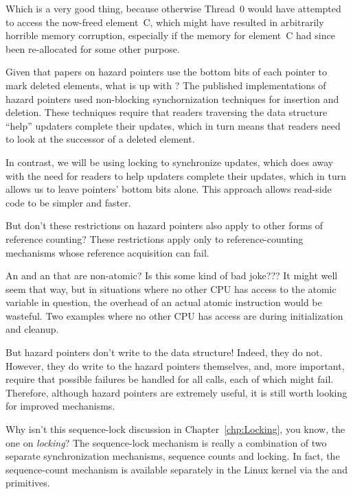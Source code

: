 	Which is a very good thing, because otherwise Thread~0 would
	have attempted to access the now-freed element~C,
	which might have resulted in arbitrarily horrible
	memory corruption, especially if the memory for
	element~C had since been re-allocated for some other
	purpose.

\QuickQ{}
	Given that papers on hazard pointers use the bottom bits
	of each pointer to mark deleted elements, what is up with
	?
\QuickA{}
	The published implementations of hazard pointers used
	non-blocking synchornization techniques for insertion
	and deletion.
	These techniques require that readers traversing the
	data structure ``help'' updaters complete their updates,
	which in turn means that readers need to look at the successor
	of a deleted element.

	In contrast, we will be using locking to synchronize updates,
	which does away with the need for readers to help updaters
	complete their updates, which in turn allows us to leave
	pointers' bottom bits alone.
	This approach allows read-side code to be simpler and faster.

\QuickQ{}
	But don't these restrictions on hazard pointers also apply
	to other forms of reference counting?
\QuickA{}
	These restrictions apply only to reference-counting mechanisms whose
	reference acquisition can fail.

\QuickQ{}
	An  and an  that are
	non-atomic?
	Is this some kind of bad joke???
\QuickA{}
	It might well seem that way, but in situations where no other
	CPU has access to the atomic variable in question, the overhead
	of an actual atomic instruction would be wasteful.
	Two examples where no other CPU has access are
	during initialization and cleanup.

\QuickQ{}
	But hazard pointers don't write to the data structure!
\QuickA{}
	Indeed, they do not.
	However, they do write to the hazard pointers themselves,
	and, more important, require that possible failures be
	handled for all  calls, each of which
	might fail.
	Therefore, although hazard pointers are extremely useful,
	it is still worth looking for improved mechanisms.

\QuickQ{}
	Why isn't this sequence-lock discussion in Chapter~\ref{chp:Locking},
	you know, the one on \emph{locking}?
\QuickA{}
	The sequence-lock mechanism is really a combination of two
	separate synchronization mechanisms, sequence counts and
	locking.
	In fact, the sequence-count mechanism is available separately
	in the Linux kernel via the
	 and 
	primitives.

